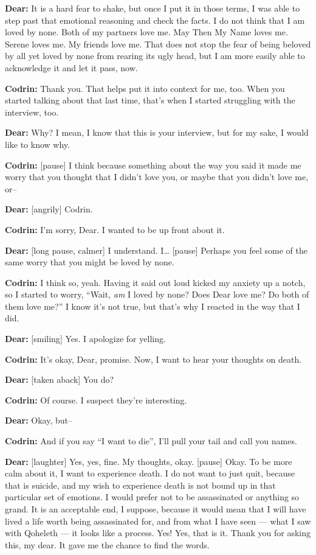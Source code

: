 \textbf{Dear:} It is a hard fear to shake, but once I put it in those terms, I was able to step past that emotional reasoning and check the facts. I do not think that I am loved by none. Both of my partners love me. May Then My Name loves me. Serene loves me. My friends love me. That does not stop the fear of being beloved by all yet loved by none from rearing its ugly head, but I am more easily able to acknowledge it and let it pass, now.

\textbf{Codrin:} Thank you. That helps put it into context for me, too. When you started talking about that last time, that's when I started struggling with the interview, too.

\textbf{Dear:} Why? I mean, I know that this is your interview, but for my sake, I would like to know why.

\textbf{Codrin:} {[}pause{]} I think because something about the way you said it made me worry that you thought that I didn't love you, or maybe that you didn't love me, or--

\textbf{Dear:} {[}angrily{]} Codrin.

\textbf{Codrin:} I'm sorry, Dear. I wanted to be up front about it.

\textbf{Dear:} {[}long pause, calmer{]} I understand. I\ldots{} {[}pause{]} Perhaps you feel some of the same worry that you might be loved by none.

\textbf{Codrin:} I think so, yeah. Having it said out loud kicked my anxiety up a notch, so I started to worry, ``Wait, \emph{am} I loved by none? Does Dear love me? Do both of them love me?'' I know it's not true, but that's why I reacted in the way that I did.

\textbf{Dear:} {[}smiling{]} Yes. I apologize for yelling.

\textbf{Codrin:} It's okay, Dear, promise. Now, I want to hear your thoughts on death.

\textbf{Dear:} {[}taken aback{]} You do?

\textbf{Codrin:} Of course. I suspect they're interesting.

\textbf{Dear:} Okay, but--

\textbf{Codrin:} And if you say ``I want to die'', I'll pull your tail and call you names.

\textbf{Dear:} {[}laughter{]} Yes, yes, fine. My thoughts, okay. {[}pause{]} Okay. To be more calm about it, I want to experience death. I do not want to just quit, because that is suicide, and my wish to experience death is not bound up in that particular set of emotions. I would prefer not to be assassinated or anything so grand. It is an acceptable end, I suppose, because it would mean that I will have lived a life worth being assassinated for, and from what I have seen — what I saw with Qoheleth — it looks like a process. Yes! Yes, that is it. Thank you for asking this, my dear. It gave me the chance to find the words.

